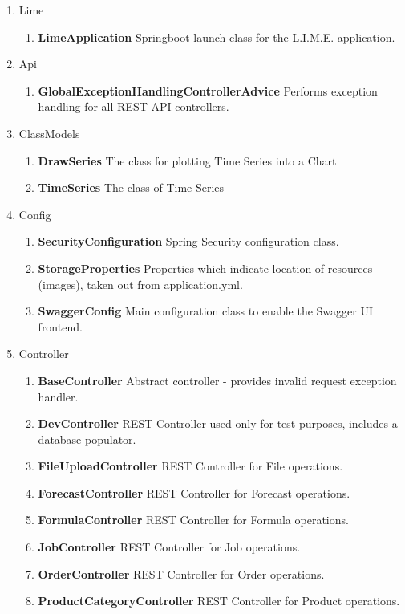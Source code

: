 \documentclass[a4paper,11pt,twoside]{report}
\theoremstyle{definition}
\begin{document}
\begin{enumerate} 
\item Lime 
\begin{enumerate} 
\item \textbf{LimeApplication} Springboot launch class for the L.I.M.E. application.
\end{enumerate}
\item Api 
\begin{enumerate} 
\item \textbf{GlobalExceptionHandlingControllerAdvice} Performs exception handling for all REST API controllers.
\end{enumerate} 
\item ClassModels 
\begin{enumerate} 
\item \textbf{DrawSeries} The class for plotting Time Series into a Chart
\item \textbf{TimeSeries} The class of Time Series
\end{enumerate} 
\item Config 
\begin{enumerate} 
\item \textbf{SecurityConfiguration} Spring Security configuration class.

\item \textbf{StorageProperties} Properties which indicate location of resources (images), taken out from application.yml.
\item \textbf{SwaggerConfig} Main configuration class to enable the Swagger UI frontend.
\end{enumerate} 

\item Controller 
\begin{enumerate} 
\item \textbf{BaseController} Abstract controller - provides invalid request exception handler.
\item \textbf{DevController} REST Controller used only for test purposes, includes a database populator.
\item \textbf{FileUploadController} REST Controller for File operations.
\item \textbf{ForecastController} REST Controller for Forecast operations.
\item \textbf{FormulaController} REST Controller for Formula operations.
\item \textbf{JobController} REST Controller for Job operations.
\item \textbf{OrderController} REST Controller for Order operations.
\item \textbf{ProductCategoryController} REST Controller for Product operations.


\end{enumerate}
\end{enumerate}
\end{document}

